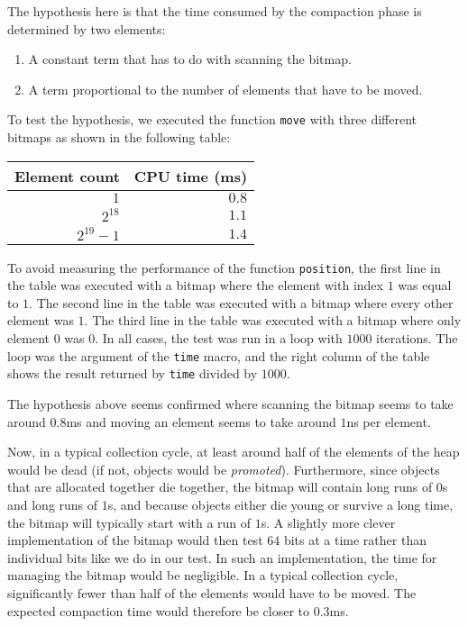 The hypothesis here is that the time consumed by the compaction phase
is determined by two elements:

\begin{enumerate}
\item A constant term that has to do with scanning the bitmap.
\item A term proportional to the number of elements that have to be
  moved.
\end{enumerate}

To test the hypothesis, we executed the function \texttt{move} with
three different bitmaps as shown in the following table:

\begin{tabular}{|r|r|}
\hline
Element count & CPU time (ms)\\
\hline
$1$ & $0.8$ \\
$2^{18}$ & $1.1$\\
$2^{19}-1$ & $1.4$\\
\hline
\end{tabular}

To avoid measuring the performance of the function \texttt{position},
the first line in the table was executed with a bitmap where the
element with index $1$ was equal to $1$.  The second line in the table
was executed with a bitmap where every other element was $1$.  The
third line in the table was executed with a bitmap where only element
$0$ was $0$.  In all cases, the test was run in a loop with $1000$
iterations.  The loop was the argument of the \texttt{time} macro, and
the right column of the table shows the result returned by
\texttt{time} divided by $1000$. 

The hypothesis above seems confirmed where scanning the bitmap seems
to take around $0.8$ms and moving an element seems to take around
$1$ns per element.  

Now, in a typical collection cycle, at least around half of the
elements of the heap would be dead (if not, objects would be
\emph{promoted}).  Furthermore, since objects that are allocated
together die together, the bitmap will contain long runs of $0$s and
long runs of $1$s, and because objects either die young or survive a
long time, the bitmap will typically start with a run of $1$s.  A
slightly more clever implementation of the bitmap would then test $64$
bits at a time rather than individual bits like we do in our test.  In
such an implementation, the time for managing the bitmap would be
negligible.  In a typical collection cycle, significantly fewer than
half of the elements would have to be moved.  The expected compaction
time would therefore be closer to $0.3$ms. 

